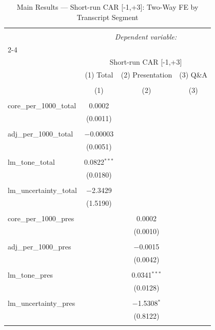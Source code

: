 
\begin{table}[!htbp] \centering 
  \caption{Main Results — Short-run CAR [-1,+3]: Two-Way FE by Transcript Segment} 
  \label{} 
\begin{tabular}{@{\extracolsep{5pt}}lccc} 
\\[-1.8ex]\hline 
\hline \\[-1.8ex] 
 & \multicolumn{3}{c}{\textit{Dependent variable:}} \\ 
\cline{2-4} 
\\[-1.8ex] & \multicolumn{3}{c}{Short-run CAR [-1,+3]} \\ 
 & (1) Total & (2) Presentation & (3) Q\&A \\ 
\\[-1.8ex] & (1) & (2) & (3)\\ 
\hline \\[-1.8ex] 
 core\_per\_1000\_total & 0.0002 &  &  \\ 
  & (0.0011) &  &  \\ 
  & & & \\ 
 adj\_per\_1000\_total & $-$0.00003 &  &  \\ 
  & (0.0051) &  &  \\ 
  & & & \\ 
 lm\_tone\_total & 0.0822$^{***}$ &  &  \\ 
  & (0.0180) &  &  \\ 
  & & & \\ 
 lm\_uncertainty\_total & $-$2.3429 &  &  \\ 
  & (1.5190) &  &  \\ 
  & & & \\ 
 core\_per\_1000\_pres &  & 0.0002 &  \\ 
  &  & (0.0010) &  \\ 
  & & & \\ 
 adj\_per\_1000\_pres &  & $-$0.0015 &  \\ 
  &  & (0.0042) &  \\ 
  & & & \\ 
 lm\_tone\_pres &  & 0.0341$^{***}$ &  \\ 
  &  & (0.0128) &  \\ 
  & & & \\ 
 lm\_uncertainty\_pres &  & $-$1.5308$^{*}$ &  \\ 
  &  & (0.8122) &  \\ 
  & & & \\ 

\end{tabular}
\end{table}
